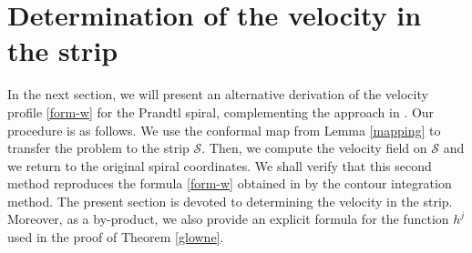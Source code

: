 \documentclass[11pt, letterpaper, reqno]{amsart}
\numberwithin{equation}{section}
\theoremstyle{definition}
\theoremstyle{plain}
\numberwithin{equation}{section}
\def\SS{\mathcal{S}}
\begin{document}
\section{Determination of the velocity in the strip}\label{sec-4}
In the next section, we will present an alternative derivation of the velocity profile \eqref{form-w} for the Prandtl spiral, complementing the approach in \cite{CKO}. Our procedure is as follows. We use the conformal map from Lemma \ref{mapping} to transfer the problem to the strip 
$\SS$. Then, we compute the velocity field on $\SS$ and we return to the original spiral coordinates. We shall verify that this second method reproduces the formula \eqref{form-w} obtained in \cite{CKO} by the contour integration method. The present section is devoted to determining the velocity in the strip. Moreover, as a by-product, we also provide an explicit formula for the function $h^{j}$ used in the proof of Theorem \ref{glowne}.
\end{document}
